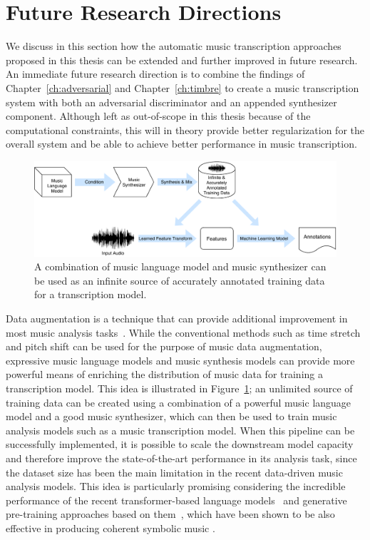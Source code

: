 \section{Future Research Directions}

We discuss in this section how the automatic music transcription approaches proposed in this thesis can be extended and further improved in future research.
An immediate future research direction is to combine the findings of Chapter~\ref{ch:adversarial} and Chapter~\ref{ch:timbre} to create a music transcription system with both an adversarial discriminator and an appended synthesizer component.
Although left as out-of-scope in this thesis because of the computational constraints, this will in theory provide better regularization for the overall system and be able to achieve better performance in music transcription.


\begin{figure}
	\centering
	\includegraphics[width=\textwidth]{paradigms-5-proposed.pdf}
	\caption{A combination of music language model and music synthesizer can be used as an infinite source of accurately annotated training data for a transcription model.}\label{fig:unlimited-data}
\end{figure}

Data augmentation is a technique that can provide additional improvement in most music analysis tasks~\cite{mcfee2015muda}. %
While the conventional methods such as time stretch and pitch shift can be used for the purpose of music data augmentation, expressive music language models and music synthesis models can provide more powerful means of enriching the distribution of music data for training a transcription model.
This idea is illustrated in Figure~\ref{fig:unlimited-data}; an unlimited source of training data can be created using a combination of a powerful music language model and a good music synthesizer, which can then be used to train music analysis models such as a music transcription model.
When this pipeline can be successfully implemented, it is possible to scale the downstream model capacity and therefore improve the state-of-the-art performance in its analysis task, since the dataset size has been the main limitation in the recent data-driven music analysis models.
This idea is particularly promising considering the incredible performance of the recent transformer-based language models~\cite{vaswani2017attention} and generative pre-training approaches based on them~\cite{radford2018gpt,devlin2018bert}, which have been shown to be also effective in producing coherent symbolic music \cite{huang2019transformer}.

